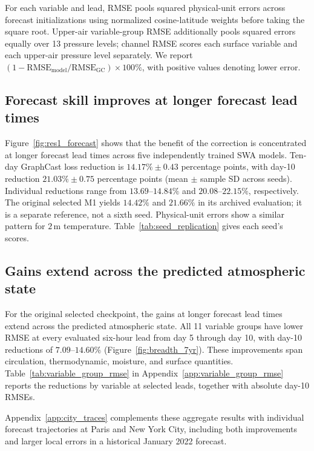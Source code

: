 \documentclass{article}
\newcommand{\vfourchange}[1]{{\color{blue}#1}}
\begin{document}
For each variable and lead, RMSE pools squared physical-unit errors across forecast initializations using normalized cosine-latitude weights before taking the square root. Upper-air variable-group RMSE additionally pools squared errors equally over 13 pressure levels; channel RMSE scores each surface variable and each upper-air pressure level separately. We report $(1-\mathrm{RMSE}_{\mathrm{model}}/\mathrm{RMSE}_{\mathrm{GC}})\times 100\%$, with positive values denoting lower error.

\subsection{Forecast skill improves at longer forecast lead times}

Figure~\ref{fig:res1_forecast} shows that the benefit of the correction is concentrated at longer forecast lead times\vfourchange{ across five independently trained SWA models}. \vfourchange{Ten-day GraphCast loss reduction is $14.17\%\pm0.43$ percentage points, with day-10 reduction $21.03\%\pm0.75$ percentage points (mean $\pm$ sample SD across seeds). Individual reductions range from $13.69$--$14.84\%$ and $20.08$--$22.15\%$, respectively. The original selected M1 yields $14.42\%$ and $21.66\%$ in its archived evaluation; it is a separate reference, not a sixth seed.} Physical-unit errors show a similar pattern\vfourchange{ for $2$\,m temperature}. \vfourchange{Table~\ref{tab:seed_replication} gives each seed's scores.}




\subsection{Gains extend across the predicted atmospheric state}
\vfourchange{For the original selected checkpoint,} the gains at longer forecast lead times extend across the predicted atmospheric state. All 11 variable groups have lower RMSE at every evaluated six-hour lead from day 5 through day 10, with day-10 reductions of \vfourchange{$7.09$--$14.60\%$} (Figure~\ref{fig:breadth_7yr}). These improvements span circulation, thermodynamic, moisture, and surface quantities. Table~\ref{tab:variable_group_rmse} in Appendix~\ref{app:variable_group_rmse} reports the reductions by variable at selected leads, together with absolute day-10 RMSEs.



Appendix~\ref{app:city_traces} complements these aggregate results with individual forecast trajectories at Paris and New York City, including both improvements and larger local errors\vfourchange{ in a historical January 2022 forecast}.
\end{document}
